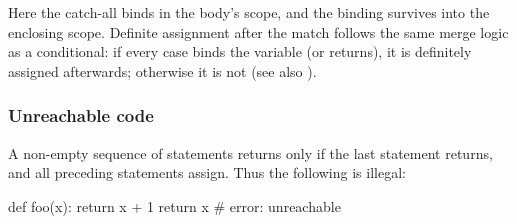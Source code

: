 \begin{PaperOnly}
Here the catch-all  binds  in the body's scope, and the binding survives into
the enclosing scope. Definite assignment after the match follows the same merge logic as a conditional: if
every case binds the variable (or returns), it is definitely assigned afterwards; otherwise it is not (see
also ).

\subsubsection{Unreachable code}
\label{sec:unreachable}
A non-empty sequence of statements returns only if the last statement returns, and all preceding statements
assign. Thus the following is illegal:

\begin{python}
def foo(x):
  return x + 1
  return x    # error: unreachable
\end{python}
\end{PaperOnly}
